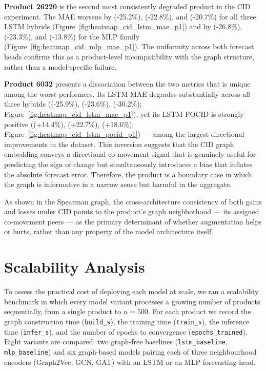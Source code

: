 \textbf{Product 26220} is the second most consistently degraded product in the CID experiment. The MAE worsens by (-25.2\%), (-22.8\%), and (-20.7\%) for all three LSTM hybrids (Figure~\ref{fig:heatmap_cid_lstm_mae_p1}) and by (-26.8\%), (-23.3\%), and (-13.8\%) for the MLP family (Figure~\ref{fig:heatmap_cid_mlp_mae_p1}). The uniformity across both forecast heads confirms this as a product-level incompatibility with the graph structure, rather than a model-specific failure.

\textbf{Product 6032} presents a dissociation between the two metrics that is unique among the worst performers. Its LSTM MAE degrades substantially across all three hybrids ((-25.9\%), (-23.6\%), (-30.2\%); Figure~\ref{fig:heatmap_cid_lstm_mae_p1}), yet its LSTM POCID is strongly positive ((+14.4\%), (+22.7\%), (+18.6\%); Figure~\ref{fig:heatmap_cid_lstm_pocid_p1}) — among the largest directional improvements in the dataset. This inversion suggests that the CID graph embedding conveys a directional co-movement signal that is genuinely useful for predicting the sign of change but simultaneously introduces a bias that inflates the absolute forecast error. Therefore, the product is a boundary case in which the graph is informative in a narrow sense but harmful in the aggregate.

As shown in the Spearman graph, the cross-architecture consistency of both gains and losses under CID points to the product's graph neighborhood — its assigned co-movement peers — as the primary determinant of whether augmentation helps or hurts, rather than any property of the model architecture itself.


\section{Scalability Analysis}
\label{sec:scalability}

To assess the practical cost of deploying each model at scale, we ran a scalability
benchmark in which every model variant processes a growing number of products
sequentially, from a single product to $n=500$. For each product we record the
graph construction time (\texttt{build\_s}), the training time (\texttt{train\_s}),
the inference time (\texttt{infer\_s}), and the number of epochs to convergence
(\texttt{epochs\_trained}). Eight variants are compared: two graph-free baselines
(\texttt{lstm\_baseline}, \texttt{mlp\_baseline}) and six graph-based models pairing
each of three neighbourhood encoders (Graph2Vec, GCN, GAT) with an LSTM or an MLP
forecasting head.

